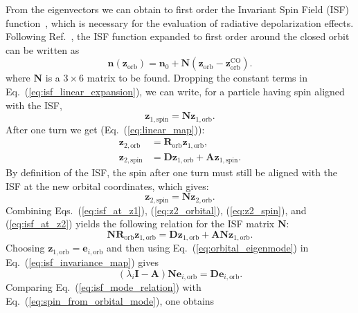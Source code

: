 \documentclass[a4paper,
               biblatex,     %
               hyphens,      %
               ]{jacow}
\begin{document}
From the eigenvectors we can obtain to first order the Invariant Spin Field (ISF) function~\cite{Chao:1980fz,hoffstaetter2006high}, which is necessary for the evaluation of radiative depolarization effects.
Following Ref.~\cite{Chao:1980fz}, the ISF function expanded to first order around the closed orbit can be written as
\begin{equation}
\bm{n}(\bm{z}_{\mathrm{orb}}) = \bm{n}_0 + \mathbf{N}
\left(\bm{z}_{\mathrm{orb}} - \bm{z}_{\mathrm{orb}}^{\mathrm{CO}}\right).
\label{eq:isf_linear_expansion}
\end{equation}
where $\mathbf{N}$ is a $3\times6$ matrix to be found.
Dropping the constant terms in Eq.~(\ref{eq:isf_linear_expansion}), we can write, for a particle having spin aligned with the ISF,
\begin{equation}
\bm{z}_{1,\mathrm{spin}} = \mathbf{N}\bm{z}_{1,\mathrm{orb}}.
\label{eq:isf_at_z1}
\end{equation}
After one turn we get (Eq.~(\ref{eq:linear_map})):
\begin{align}
\bm{z}_{2,\mathrm{orb}} &= \mathbf{R}_{\mathrm{orb}}\bm{z}_{1,\mathrm{orb}},
\label{eq:z2_orbital}\\
\bm{z}_{2,\mathrm{spin}} &= \mathbf{D}\bm{z}_{1,\mathrm{orb}} + \mathbf{A}\bm{z}_{1,\mathrm{spin}}.
\label{eq:z2_spin}
\end{align}
By definition of the ISF, the spin after one turn must still be aligned with the ISF at the new orbital coordinates, which gives:
\begin{equation}
\bm{z}_{2,\mathrm{spin}} = \mathbf{N}\bm{z}_{2,\mathrm{orb}}.
\label{eq:isf_at_z2}
\end{equation}
Combining Eqs.~(\ref{eq:isf_at_z1}), (\ref{eq:z2_orbital}), (\ref{eq:z2_spin}), and (\ref{eq:isf_at_z2}) yields the following relation for the ISF matrix $\mathbf{N}$:
\begin{equation}
\mathbf{N}\mathbf{R}_{\mathrm{orb}}\bm{z}_{1,\mathrm{orb}} = \mathbf{D}\bm{z}_{1,\mathrm{orb}} + \mathbf{A}\mathbf{N}\bm{z}_{1,\mathrm{orb}}.
\label{eq:isf_invariance_map}
\end{equation}
Choosing $\bm{z}_{1,\mathrm{orb}} = \bm{e}_{i,\mathrm{orb}}$ and then using Eq.~(\ref{eq:orbital_eigenmode}) in Eq.~(\ref{eq:isf_invariance_map}) gives
\begin{equation}
(\lambda_i\mathbf{I} - \mathbf{A})\mathbf{N}\bm{e}_{i,\mathrm{orb}} = \mathbf{D}\bm{e}_{i,\mathrm{orb}}.
\label{eq:isf_mode_relation}
\end{equation}
Comparing Eq.~(\ref{eq:isf_mode_relation}) with Eq.~(\ref{eq:spin_from_orbital_mode}), one obtains
\end{document}
